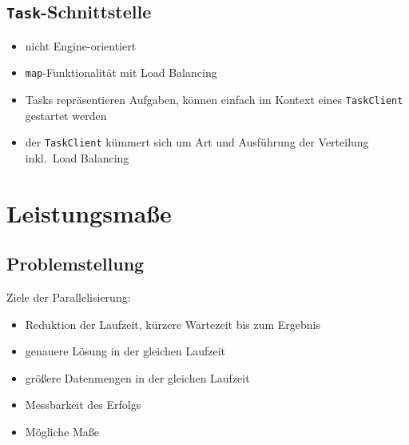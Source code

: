 \documentclass[a4paper, 12pt]{article}
\begin{document}
\subsection{\texttt{Task}-Schnittstelle}
\begin{itemize}
  \item nicht Engine-orientiert
  \item \texttt{map}-Funktionalität mit Load Balancing
  \item Tasks repräsentieren Aufgaben, können einfach im Kontext eines \texttt{TaskClient} gestartet werden
  \item der \texttt{TaskClient} kümmert sich um Art und Ausführung der Verteilung inkl.\ Load Balancing
\end{itemize}



\section{Leistungsmaße}


\subsection{Problemstellung}
Ziele der Parallelisierung:
\begin{itemize}
  \item Reduktion der Laufzeit, kürzere Wartezeit bis zum Ergebnis
  \item genauere Lösung in der gleichen Laufzeit
  \item größere Datenmengen in der gleichen Laufzeit
\end{itemize}
\begin{itemize}
  \renewcommand{\labelitemi}{\Large{?}}%
  \item Messbarkeit des Erfolgs
  \item Mögliche Maße
\end{itemize}
\end{document}
